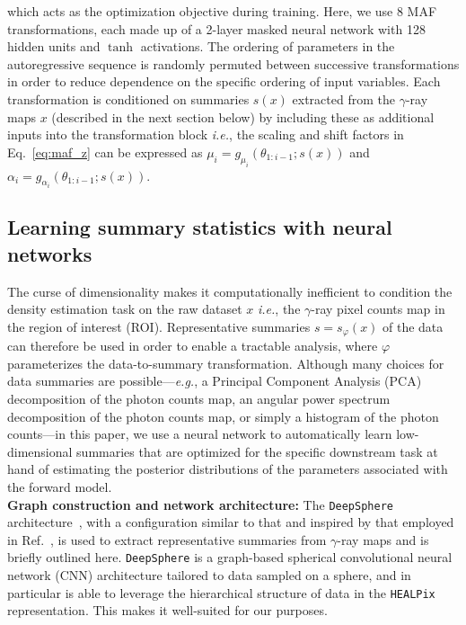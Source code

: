 \documentclass[prd,aps,10pt,nofootinbib,twocolumn,superscriptaddress,preprintnumbers,balancelastpage,longbibliography]{revtex4-1}
\begin{document}
which acts as the optimization objective during training. Here, we use 8 MAF transformations, each made up of a 2-layer masked neural network with 128 hidden units and $\tanh$ activations. The ordering of parameters in the autoregressive sequence is randomly permuted between successive transformations in order to reduce dependence on the specific ordering of input variables. Each transformation is conditioned on summaries $s(x)$ extracted from the $\gamma$-ray maps $x$ (described in the next section below) by including these as additional inputs into the transformation block \emph{i.e.}, the scaling and shift factors in Eq.~\eqref{eq:maf_z} can be expressed as $\mu_{i}=g_{\mu_{i}}\left({\theta}_{1: i-1} ; {s(x)}\right)$ and $\alpha_i = g_{\alpha_{i}}\left({\theta}_{1: i-1} ; {s(x)}\right)$.

\subsection{Learning summary statistics with neural networks}

The curse of dimensionality makes it computationally inefficient to condition the density estimation task on the raw dataset $x$ \emph{i.e.}, the $\gamma$-ray pixel counts map in the region of interest (ROI). Representative summaries $s = s_\varphi(x)$ of the data can therefore be used in order to enable a tractable analysis, where $\varphi$ parameterizes the data-to-summary transformation. Although many choices for data summaries are possible---\emph{e.g.}, a Principal Component Analysis (PCA) decomposition of the photon counts map, an angular power spectrum decomposition of the photon counts map, or simply a histogram of the photon counts---in this paper, we use a neural network to automatically learn low-dimensional summaries that are optimized for the specific downstream task at hand of estimating the posterior distributions of the parameters associated with the forward model. \\

\noindent
\textbf{Graph construction and network architecture:}
The \texttt{DeepSphere} architecture~\cite{defferrard2020deepsphere,Perraudin:2018rbt,deepsphere_rlgm}, with a configuration similar to that and inspired by that employed in Ref.~\cite{List:2020mzd}, is used to extract representative summaries from $\gamma$-ray maps and is briefly outlined here. \texttt{DeepSphere} is a graph-based spherical convolutional neural network (CNN) architecture tailored to data sampled on a sphere, and in particular is able to leverage the hierarchical structure of data in the \texttt{HEALPix} representation. This makes it well-suited for our purposes.
\end{document}
